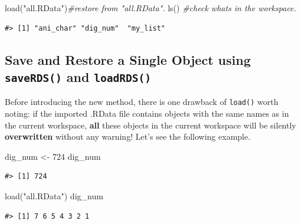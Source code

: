 \documentclass[
]{book}
\newenvironment{Shaded}{\begin{snugshade}}{\end{snugshade}}
\newcommand{\CommentTok}[1]{\textcolor[rgb]{0.56,0.35,0.01}{\textit{#1}}}
\newcommand{\DecValTok}[1]{\textcolor[rgb]{0.00,0.00,0.81}{#1}}
\newcommand{\FunctionTok}[1]{\textcolor[rgb]{0.00,0.00,0.00}{#1}}
\newcommand{\NormalTok}[1]{#1}
\newcommand{\OtherTok}[1]{\textcolor[rgb]{0.56,0.35,0.01}{#1}}
\newcommand{\StringTok}[1]{\textcolor[rgb]{0.31,0.60,0.02}{#1}}
\begin{document}
\begin{Shaded}
\begin{Highlighting}[]
\FunctionTok{load}\NormalTok{(}\StringTok{"all.RData"}\NormalTok{)}\CommentTok{\#restore from "all.RData".}
\FunctionTok{ls}\NormalTok{()             }\CommentTok{\#check what\textquotesingle{}s in the workspace.}
\end{Highlighting}
\end{Shaded}

\begin{verbatim}
#> [1] "ani_char" "dig_num"  "my_list"
\end{verbatim}

\hypertarget{save-and-restore-a-single-object-using-saverds-and-loadrds}{%
\subsection{\texorpdfstring{Save and Restore a Single Object using \texttt{saveRDS()} and \texttt{loadRDS()}}{Save and Restore a Single Object using saveRDS() and loadRDS()}}\label{save-and-restore-a-single-object-using-saverds-and-loadrds}}

Before introducing the new method, there is one drawback of \texttt{load()} worth noting: if the imported .RData file contains objects with the same names as in the current workspace, \textbf{all} these objects in the current workspace will be silently \textbf{overwritten} without any warning! Let's see the following example.

\begin{Shaded}
\begin{Highlighting}[]
\NormalTok{dig\_num }\OtherTok{\textless{}{-}} \DecValTok{724}
\NormalTok{dig\_num}
\end{Highlighting}
\end{Shaded}

\begin{verbatim}
#> [1] 724
\end{verbatim}

\begin{Shaded}
\begin{Highlighting}[]
\FunctionTok{load}\NormalTok{(}\StringTok{"all.RData"}\NormalTok{)}
\NormalTok{dig\_num}
\end{Highlighting}
\end{Shaded}

\begin{verbatim}
#> [1] 7 6 5 4 3 2 1
\end{verbatim}
\end{document}
